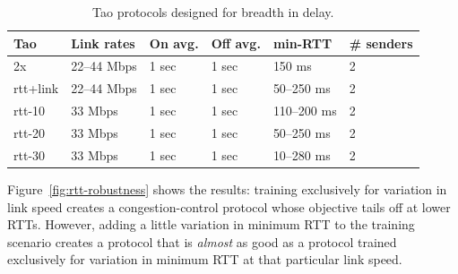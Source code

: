 \begin{table}
\small
\begin{tabular}{l|l|l|l|l|l}
\bf Tao & \bf Link rates & \bf On avg. & \bf Off avg. & \bf min-RTT &
\bf \# senders \\
\hline
2x        & 22--44 Mbps & 1 sec & 1 sec & 150 ms & 2 \\
rtt+link  & 22--44 Mbps & 1 sec & 1 sec & 50--250 ms & 2 \\
rtt-10    & 33 Mbps & 1 sec & 1 sec & 110--200 ms & 2 \\
rtt-20    & 33 Mbps & 1 sec & 1 sec & 50--250 ms & 2 \\
rtt-30    & 33 Mbps & 1 sec & 1 sec & 10--280 ms & 2 \\
\end{tabular}
\caption{Tao protocols designed for breadth in delay.}
\label{table:rtt-linkspeed}
\end{table}

Figure~\ref{fig:rtt-robustness} shows the results: training
exclusively for variation in link speed creates a congestion-control
protocol whose objective tails off at lower RTTs. However, adding a
little variation in minimum RTT to the training scenario creates a
protocol that is \emph{almost} as good as a protocol trained exclusively for
variation in minimum RTT at that particular link speed.

